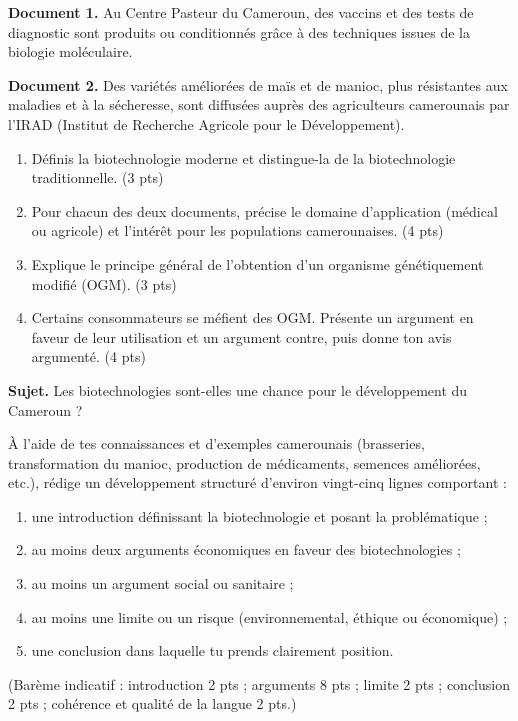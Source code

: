 \documentclass[11pt]{article}
\begin{document}
\begin{exercice}
\textbf{Document 1.} Au Centre Pasteur du Cameroun, des vaccins et des tests de diagnostic sont produits ou conditionnés grâce à des techniques issues de la biologie moléculaire.

\textbf{Document 2.} Des variétés améliorées de maïs et de manioc, plus résistantes aux maladies et à la sécheresse, sont diffusées auprès des agriculteurs camerounais par l'IRAD (Institut de Recherche Agricole pour le Développement).

\begin{enumerate}
\item Définis la biotechnologie moderne et distingue-la de la biotechnologie traditionnelle. \hfill (3 pts)
\item Pour chacun des deux documents, précise le domaine d'application (médical ou agricole) et l'intérêt pour les populations camerounaises. \hfill (4 pts)
\item Explique le principe général de l'obtention d'un organisme génétiquement modifié (OGM). \hfill (3 pts)
\item Certains consommateurs se méfient des OGM. Présente un argument en faveur de leur utilisation et un argument contre, puis donne ton avis argumenté. \hfill (4 pts)
\end{enumerate}
\end{exercice}

\begin{exercice}
\textbf{Sujet.} \og Les biotechnologies sont-elles une chance pour le développement du Cameroun ? \fg{}

À l'aide de tes connaissances et d'exemples camerounais (brasseries, transformation du manioc, production de médicaments, semences améliorées, etc.), rédige un développement structuré d'environ vingt-cinq lignes comportant :
\begin{enumerate}
\item une introduction définissant la biotechnologie et posant la problématique ;
\item au moins deux arguments économiques en faveur des biotechnologies ;
\item au moins un argument social ou sanitaire ;
\item au moins une limite ou un risque (environnemental, éthique ou économique) ;
\item une conclusion dans laquelle tu prends clairement position.
\end{enumerate}
\hfill (Barème indicatif : introduction 2 pts ; arguments 8 pts ; limite 2 pts ; conclusion 2 pts ; cohérence et qualité de la langue 2 pts.)
\end{exercice}
\end{document}

